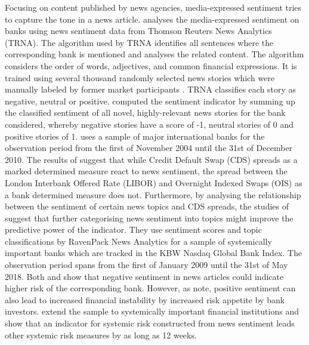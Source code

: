  Focusing on content published by news agencies, media-expressed sentiment tries to capture the tone in a news article. \cite{smales2016} analyses the media-expressed sentiment on banks using news sentiment data from Thomson Reuters News Analytics (TRNA). The algorithm used by TRNA identifies all sentences where the corresponding bank is mentioned and analyses the related content. The algorithm considers the order of words, adjectives, and common financial expressions. It is trained using several thousand randomly selected news stories which were manually labeled by former market participants \citep{smales2016}. TRNA classifies each story as negative, neutral or positive. \cite{smales2016} computed the sentiment indicator by summing up the classified sentiment of all novel, highly-relevant news stories for the bank considered, whereby negative stories have a score of -1, neutral stories of 0 and positive stories of 1. \cite{smales2016} uses a sample of major international banks for the observation period from the first of November 2004 until the 31st of December 2010. The results of \cite{smales2016} suggest that while Credit Default Swap (CDS) spreads as a marked determined measure react to news sentiment, the spread between the London Interbank Offered Rate (LIBOR) and Overnight Indexed Swaps (OIS) as a bank determined measure does not. Furthermore, by analysing the relationship between the sentiment of certain news topics and CDS spreads, the studies of \cite{roeder2020} suggest that further categorising news sentiment into topics might improve the predictive power of the indicator. They use sentiment scores and topic classifications by RavenPack News Analytics for a sample of systemically important banks which are tracked in the KBW Nasdaq Global Bank Index. The observation period spans from the first of January 2009 until the 31st of May 2018. Both \cite{smales2016} and \cite{roeder2020} show that negative sentiment in news articles could indicate higher risk of the corresponding bank. However, as \cite{agoraki2022} note, positive sentiment can also lead to increased financial instability by increased risk appetite by bank investors. \cite{borovkova2017} extend the sample to systemically important financial institutions and show that an indicator for systemic risk constructed from news sentiment leads other systemic risk measures by as long as 12 weeks. \\
 
